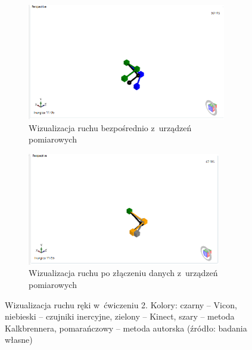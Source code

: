 	\begin{figure}[!htb]
		\captionsetup{singlelinecheck=off}
		\centering
		\begin{subfigure}[b]{0.48\textwidth}
			\centering
			\includegraphics[width=\textwidth]{images/200/raw.png}	
			\caption{Wizualizacja ruchu bezpośrednio z~urządzeń pomiarowych}
			\label{fig:experiments:sec:raw}
		\end{subfigure}
								\hfill																																	
		\begin{subfigure}[b]{0.48\textwidth}
			\centering
			\includegraphics[width=\textwidth]{images/200/Fused.png}		
			\caption{Wizualizacja ruchu po złączeniu danych z~urządzeń pomiarowych}
			\label{fig:experiments:sec:fused}
		\end{subfigure}
																																								
		\caption[Wizualizacja ruchu ręki w~ćwiczeniu 2]{Wizualizacja ruchu ręki w~ćwiczeniu 2.  Kolory: czarny -- Vicon, niebieski -- czujniki inercyjne, zielony -- Kinect, szary -- metoda Kalkbrennera, pomarańczowy -- metoda autorska (źródło: badania własne)}	
		\label{fig:experiments:sec}
	\end{figure}

